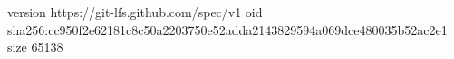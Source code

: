 version https://git-lfs.github.com/spec/v1
oid sha256:cc950f2e62181c8c50a2203750e52adda2143829594a069dce480035b52ac2e1
size 65138
